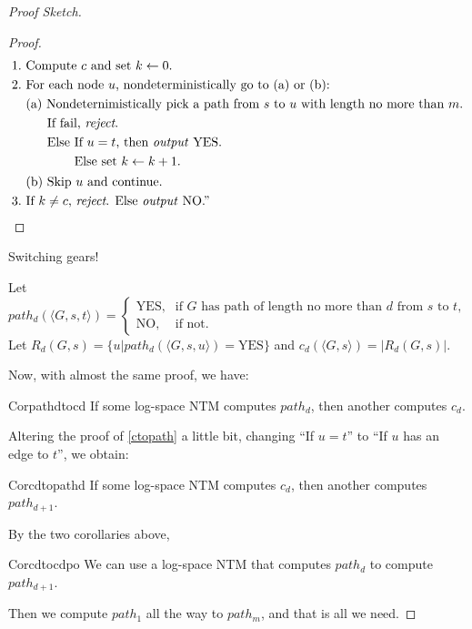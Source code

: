 \begin{proof}[Proof Sketch]
\begin{proof}
\begin{align*}
      1.   & \text{ Compute }c\text{ and set }k\leftarrow0.                                             \\
      2.   & \text{ For each node $u$, nondeterministically go to (a) or (b):}                          \\
           & \text{ (a) Nondeternimistically pick a path from $s$ to $u$ with length no more than $m$.} \\
           & \quad\quad\text{If fail, \textit{reject}.}                                                 \\
           & \quad\quad\text{Else }  \begin{aligned}[t]
                                        & \text{If $u=t$, then \textit{output} YES.} \\
                                        & \text{Else set }k\leftarrow k+1.
                                     \end{aligned}              \\
           & \text{ (b) Skip $u$ and continue.}                                                         \\
      3.   & \text{ If $k\neq c$, \textit{reject}. Else \textit{output} NO.''}\qedhere
    \end{align*}
  \end{proof}
  Switching gears!

  Let $path_d(\langle G,s,t\rangle)=\begin{cases}\text{YES,}&\text{if $G$ has path of length no more than $d$ from $s$ to $t$,}\\ \text{NO,}&\text{if not.}\end{cases}$\newline
  Let $R_d(G,s)=\{u|path_d(\langle G,s,u\rangle)=\text{YES}\}$ and $c_d(\langle G,s\rangle)=|R_d(G,s)|$.

  Now, with almost the same proof, we have:
  \begin{reference}{Cor}{pathdtocd}
    If some log-space NTM computes $path_d$, then another computes $c_d$.
  \end{reference}
  Altering the proof of \ref{ctopath} a little bit, changing ``If $u=t$'' to ``If $u$ has an edge to $t$'', we obtain:
  \begin{reference}{Cor}{cdtopathd}
    If some log-space NTM computes $c_d$, then another computes $path_{d+1}$.
  \end{reference}
  By the two corollaries above,
  \begin{reference}{Cor}{cdtocdpo}
    We can use a log-space NTM that computes $path_d$ to compute $path_{d+1}$.
  \end{reference}
  Then we compute $path_1$ all the way to $path_m$, and that is all we need.
\end{proof}

